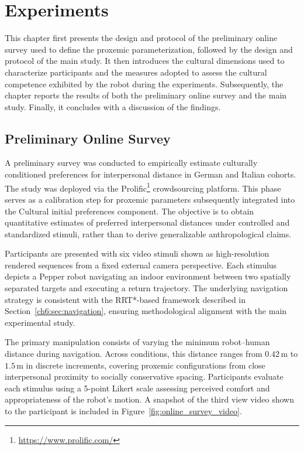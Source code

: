 \ifpdf
    \graphicspath{{Chapter7/Figs/Raster/}{Chapter7/Figs/PDF/}{Chapter7/Figs/}}
\else
    \graphicspath{{Chapter7/Figs/Vector/}{Chapter7/Figs/}}
\fi

\chapter{Experiments}
\label{ch7}

This chapter first presents the design and protocol of the preliminary online survey used to define the proxemic parameterization, followed by the design and protocol of the main study. It then introduces the cultural dimensions used to characterize participants and the measures adopted to assess the cultural competence exhibited by the robot during the experiments.
Subsequently, the chapter reports the results of both the preliminary online survey and the main study. Finally, it concludes with a discussion of the findings.

\section{Preliminary Online Survey}
\label{ch7:sec:intr}

A preliminary survey was conducted to empirically estimate culturally conditioned preferences for interpersonal distance in German and Italian cohorts. The study was deployed via the Prolific\footnote{\href{https://www.prolific.com/}{https://www.prolific.com/}} crowdsourcing platform. This phase serves as a calibration step for proxemic parameters subsequently integrated into the Cultural initial preferences component.%
The objective is to obtain quantitative estimates of preferred interpersonal distances under controlled and standardized stimuli, rather than to derive generalizable anthropological claims.

Participants are presented with six video stimuli shown as high-resolution rendered sequences from a fixed external camera perspective. Each stimulus depicts a Pepper robot navigating an indoor environment between two spatially separated targets and executing a return trajectory. The underlying navigation strategy is consistent with the RRT*-based framework described in Section~\ref{ch6:sec:navigation}, ensuring methodological alignment with the main experimental study.

The primary manipulation consists of varying the minimum robot–human distance during navigation. Across conditions, this distance ranges from $0.42\,\mathrm{m}$ to $1.5\,\mathrm{m}$ in discrete increments, covering proxemic configurations from close interpersonal proximity to socially conservative spacing. Participants evaluate each stimulus using a 5-point Likert scale assessing perceived comfort and appropriateness of the robot’s motion. A snapshot of the third view video shown to the participant is included in Figure~\ref{fig:online_survey_video}.

